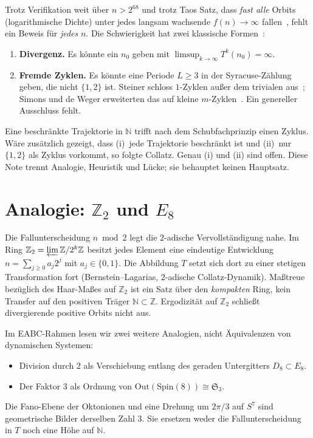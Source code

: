 \documentclass[11pt,a4paper]{article}
\theoremstyle{definition}
\theoremstyle{remark}
\numberwithin{equation}{section}
\begin{document}
Trotz Verifikation weit \"uber \(n>2^{68}\) und trotz Taos Satz, dass \emph{fast alle} Orbits
(logarithmische Dichte) unter jedes langsam wachsende \(f(n)\to\infty\) fallen~\cite{Tao2019},
fehlt ein Beweis f\"ur \emph{jedes} \(n\).
Die Schwierigkeit hat zwei klassische Formen~\cite{Lagarias1985}:
\begin{enumerate}
\item \textbf{Divergenz.} Es k\"onnte ein \(n_0\) geben mit \(\limsup_{k\to\infty}T^k(n_0)=\infty\).
\item \textbf{Fremde Zyklen.} Es k\"onnte eine Periode \(L\ge 3\) in der Syracuse-Z\"ahlung geben,
die nicht \(\{1,2\}\) ist.
Steiner schloss \(1\)-Zyklen au\ss{}er dem trivialen aus~\cite{Steiner1977};
Simons und de Weger erweiterten das auf kleine \(m\)-Zyklen~\cite{SimonsDeWeger2005}.
Ein genereller Ausschluss fehlt.
\end{enumerate}

Eine beschr\"ankte Trajektorie in \(\mathbb{N}\) trifft nach dem Schubfachprinzip einen Zyklus.
W\"are zus\"atzlich gezeigt, dass (i)~jede Trajektorie beschr\"ankt ist und (ii)~nur \(\{1,2\}\)
als Zyklus vorkommt, so folgte Collatz.
Genau (i) und (ii) sind offen.
Diese Note trennt Analogie, Heuristik und L\"ucke; sie behauptet keinen Hauptsatz.

\section{\texorpdfstring{Analogie: \(\mathbb{Z}_2\) und \(E_8\)}{Analogie: Z2 und E8}}

Die Fallunterscheidung \(n\bmod 2\) legt die \(2\)-adische Vervollst\"andigung nahe.
Im Ring \(\mathbb{Z}_2=\varprojlim\mathbb{Z}/2^k\mathbb{Z}\) besitzt jedes Element eine
eindeutige Entwicklung \(n=\sum_{j\ge 0}a_j 2^j\) mit \(a_j\in\{0,1\}\).
Die Abbildung \(T\) setzt sich dort zu einer stetigen Transformation fort
(Bernstein--Lagarias, \(2\)-adische Collatz-Dynamik).
Maßtreue bez\"uglich des Haar-Maßes auf \(\mathbb{Z}_2\) ist ein Satz \"uber den
\emph{kompakten} Ring, kein Transfer auf den positiven Tr\"ager \(\mathbb{N}\subset\mathbb{Z}\).
Ergodizit\"at auf \(\mathbb{Z}_2\) schließt divergierende positive Orbits nicht aus.

Im EABC-Rahmen lesen wir zwei weitere Analogien, nicht \"Aquivalenzen von dynamischen Systemen:
\begin{itemize}
\item Division durch \(2\) als Verschiebung entlang des geraden Untergitters \(D_8\subset E_8\).
\item Der Faktor \(3\) als Ordnung von \(\mathrm{Out}(\mathrm{Spin}(8))\cong\mathfrak{S}_3\).
\end{itemize}
Die Fano-Ebene der Oktonionen und eine Drehung um \(2\pi/3\) auf \(S^7\) sind geometrische
Bilder derselben Zahl \(3\).
Sie ersetzen weder die Fallunterscheidung in \(T\) noch eine H\"ohe auf \(\mathbb{N}\).
\end{document}

